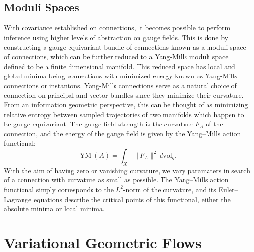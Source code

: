 \documentclass{article}
\begin{document}
\subsection{Moduli Spaces}
    With covariance established on connections, it becomes possible to perform inference using higher levels of abstraction on gauge fields. This is done by constructing a gauge equivariant bundle of connections known as a moduli space of connections, which can be further reduced to a Yang-Mills moduli space defined to be a finite dimensional manifold. This reduced space has local and global minima being connections with minimized energy known as Yang-Mills connections or instantons. Yang-Mills connections serve as a natural choice of connection on principal and vector bundles since they minimize their curvature. From an information geometric perspective, this can be thought of as minimizing relative entropy between sampled trajectories of two manifolds which happen to be gauge equivariant. The gauge field strength is the curvature $F_{A}$ of the connection, and the energy of the gauge field is given by the Yang–Mills action functional:
    \begin{equation}
         {\displaystyle \operatorname {YM} (A)=\int _{X}\|F_{A}\|^{2}\,d\mathrm {vol} _{g}.}
    \end{equation}
    With the aim of having zero or vanishing curvature, we vary paramaters in search of a connection with curvature as small as possible. The Yang–Mills action functional simply corresponds to the $L^{2}$-norm of the curvature, and its Euler–Lagrange equations describe the critical points of this functional, either the absolute minima or local minima.   

\section{Variational Geometric Flows}
\end{document}
